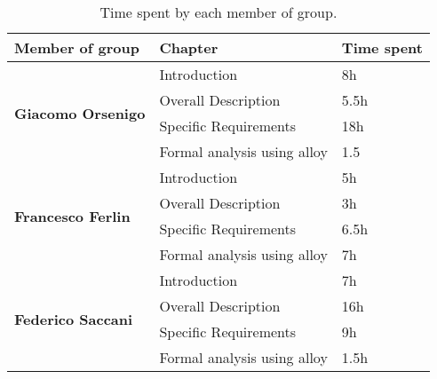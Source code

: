 \begin{table}[H]
      \centering
      \begin{tabular}{|l|l|l|}
            \hline
            \textbf{Member of group }                  & \textbf{Chapter}            & \textbf{Time spent} \\\hline
            \multirow{4}{*}{\textbf{Giacomo Orsenigo}} & Introduction                & 8h                  \\
                                                       & Overall Description         & 5.5h                \\
                                                       & Specific Requirements       & 18h                 \\
                                                       & Formal analysis using alloy & 1.5                 \\\hline
            \multirow{4}{*}{\textbf{Francesco Ferlin}} & Introduction                & 5h                  \\
                                                       & Overall Description         & 3h                  \\
                                                       & Specific Requirements       & 6.5h                \\
                                                       & Formal analysis using alloy & 7h                  \\\hline
            \multirow{4}{*}{\textbf{Federico Saccani}} & Introduction                & 7h                  \\
                                                       & Overall Description         & 16h                 \\
                                                       & Specific Requirements       & 9h                  \\
                                                       & Formal analysis using alloy & 1.5h                \\\hline
      \end{tabular}
      \caption{Time spent by each member of group.}
      \label{table:Time spent}
\end{table}
